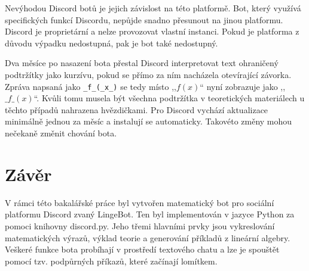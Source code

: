 \documentclass[FM]{tulthesis}
\begin{document}
	Nevýhodou Discord botů je jejich závislost na této platformě. Bot, který využívá specifických funkcí Discordu, nepůjde snadno přesunout na jinou platformu. Discord je proprietární a nelze provozovat vlastní instanci. Pokud je platforma z důvodu výpadku nedostupná, pak je bot také nedostupný.
	
	Dva měsíce po nasazení bota přestal Discord interpretovat text ohraničený podtržítky jako kurzívu, pokud se přímo za ním nacházela otevírající závorka. Zpráva napsaná jako \verb|_f_(_x_)| se tedy místo ,,$f(x)$`` nyní zobrazuje jako ,,$\_f\_(x)$``. Kvůli tomu musela být všechna podtržítka v teoretických materiálech u těchto případů nahrazena hvězdičkami. Pro Discord vychází aktualizace minimálně jednou za měsíc a instalují se automaticky. Takovéto změny mohou nečekaně změnit chování bota.

	
	\chapter{Závěr}
	
	
	
	
	
	V rámci této bakalářské práce byl vytvořen matematický bot pro sociální platformu Discord zvaný LingeBot. Ten byl implementován v jazyce Python za pomoci knihovny discord.py. Jeho třemi hlavními prvky jsou vykreslování matematických výrazů, výklad teorie a generování příkladů z lineární algebry. Veškeré funkce bota probíhají v prostředí textového chatu a lze je spouštět pomocí tzv. podpůrných příkazů, které začínají lomítkem.
	
\end{document}

